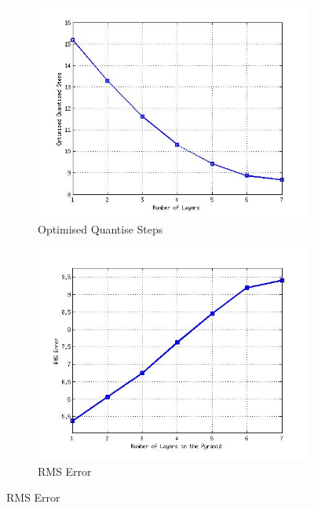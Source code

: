 \documentclass[a4paper, 11pt]{article}
\begin{document}
\begin{center}
\begin{figure}[h]
\begin{center}
	\begin{subfigure}[b]{0.3\textwidth}
		\includegraphics[width=\textwidth]{optimised_quantise_against_layers.jpg}
		\caption{Optimised Quantise Steps}
	\end{subfigure}
	\begin{subfigure}[b]{0.3\textwidth}
		\includegraphics[width=\textwidth]{rms_against_layers.jpg}
		\caption{RMS Error}
	\end{subfigure}	
	\end{center}

\end{figure}
\end{center}
\end{document}
